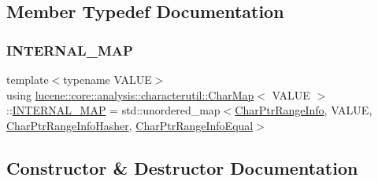 \subsection{Member Typedef Documentation}
\mbox{\label{classlucene_1_1core_1_1analysis_1_1characterutil_1_1CharMap_a0fe744ab48aa6f998a3d7e159a351d69}} 
\subsubsection{\texorpdfstring{I\+N\+T\+E\+R\+N\+A\+L\+\_\+\+M\+AP}{INTERNAL\_MAP}}
{\footnotesize\ttfamily template$<$typename V\+A\+L\+UE$>$ \\
using \mbox{\hyperlink{classlucene_1_1core_1_1analysis_1_1characterutil_1_1CharMap}{lucene\+::core\+::analysis\+::characterutil\+::\+Char\+Map}}$<$ V\+A\+L\+UE $>$\+::\mbox{\hyperlink{classlucene_1_1core_1_1analysis_1_1characterutil_1_1CharMap_a0fe744ab48aa6f998a3d7e159a351d69}{I\+N\+T\+E\+R\+N\+A\+L\+\_\+\+M\+AP}} =  std\+::unordered\+\_\+map$<$\mbox{\hyperlink{classlucene_1_1core_1_1analysis_1_1characterutil_1_1CharPtrRangeInfo}{Char\+Ptr\+Range\+Info}}, V\+A\+L\+UE, \mbox{\hyperlink{classlucene_1_1core_1_1analysis_1_1characterutil_1_1CharPtrRangeInfoHasher}{Char\+Ptr\+Range\+Info\+Hasher}}, \mbox{\hyperlink{classlucene_1_1core_1_1analysis_1_1characterutil_1_1CharPtrRangeInfoEqual}{Char\+Ptr\+Range\+Info\+Equal}}$>$\hspace{0.3cm}{\ttfamily [private]}}



\subsection{Constructor \& Destructor Documentation}
\mbox{\label{classlucene_1_1core_1_1analysis_1_1characterutil_1_1CharMap_ab593676daf8740d5f8394fabac807460}} 
